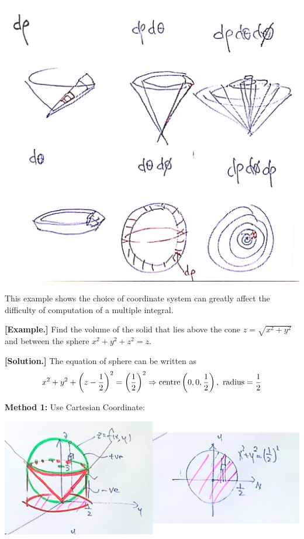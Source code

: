 \documentclass[11pt, a4paper]{MATH2023}
\newcommand{\eg}{\textbf{[Example.] }}
\newcommand{\sol}{\textbf{[Solution.] }}
\begin{document}
\begin{spacing}{1.3}
    \begin{center}
        \includegraphics[scale=0.2]{images/Ch14-int-sphere-ways.JPG}
    \end{center}

    \newpage
    {\blue This example shows the choice of coordinate system can greatly affect the difficulty of 
    computation of a multiple integral.}

    \eg Find the volume of the solid that lies above the cone $z=\sqrt{x^2+y^2}$ and between the 
    sphere $x^2+y^2+z^2=z$.

    \sol The equation of sphere can be written as 
    $$x^{2}+y^{2}+\left(z-\frac{1}{2}\right)^{2}=\left(\frac{1}{2}\right)^{2} 
    \Rightarrow {\rm centre} \left(0,0, \frac{1}{2}\right),\ {\rm radius} =\frac{1}{2}$$

    {\bf Method 1:} Use Cartesian Coordinate: 
    \begin{center}
        \includegraphics[scale=0.25]{images/Ch14-ex6.10-xy.jpg}
    \end{center}
    

\end{spacing}
\end{document}
